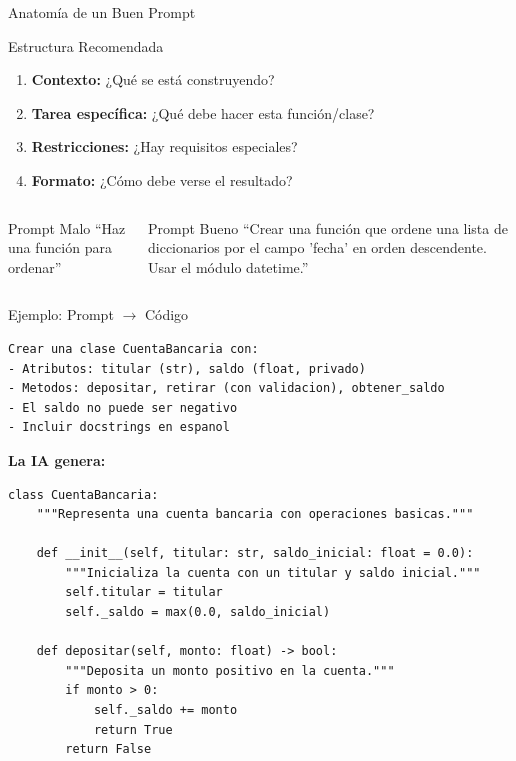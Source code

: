 \documentclass[aspectratio=169]{beamer}
\begin{document}
\begin{frame}{Anatomía de un Buen Prompt}
    \begin{exampleblock}{Estructura Recomendada}
        \begin{enumerate}
            \item \textbf{Contexto:} ¿Qué se está construyendo?
            \item \textbf{Tarea específica:} ¿Qué debe hacer esta función/clase?
            \item \textbf{Restricciones:} ¿Hay requisitos especiales?
            \item \textbf{Formato:} ¿Cómo debe verse el resultado?
        \end{enumerate}
    \end{exampleblock}
    
    \vspace{0.3cm}
    \begin{columns}
        \begin{alertblock}{Prompt Malo \faTimesCircle}
            ``Haz una función para ordenar''
        \end{alertblock}
        
        \begin{exampleblock}{Prompt Bueno \faCheckCircle}
            ``Crear una función que ordene una lista de diccionarios por el campo 'fecha' en orden descendente. Usar el módulo datetime.''
        \end{exampleblock}
    \end{columns}
\end{frame}

\begin{frame}[fragile]{Ejemplo: Prompt $\rightarrow$ Código}
    \begin{lstlisting}[style=promptstyle, title=Prompt en Cursor/Copilot]
Crear una clase CuentaBancaria con:
- Atributos: titular (str), saldo (float, privado)
- Metodos: depositar, retirar (con validacion), obtener_saldo
- El saldo no puede ser negativo
- Incluir docstrings en espanol
    \end{lstlisting}
    
    \vspace{0.2cm}
    \textbf{La IA genera:}
    \begin{lstlisting}[basicstyle=\ttfamily\tiny]
class CuentaBancaria:
    """Representa una cuenta bancaria con operaciones basicas."""
    
    def __init__(self, titular: str, saldo_inicial: float = 0.0):
        """Inicializa la cuenta con un titular y saldo inicial."""
        self.titular = titular
        self._saldo = max(0.0, saldo_inicial)
    
    def depositar(self, monto: float) -> bool:
        """Deposita un monto positivo en la cuenta."""
        if monto > 0:
            self._saldo += monto
            return True
        return False
    \end{lstlisting}
\end{frame}
\end{document}
